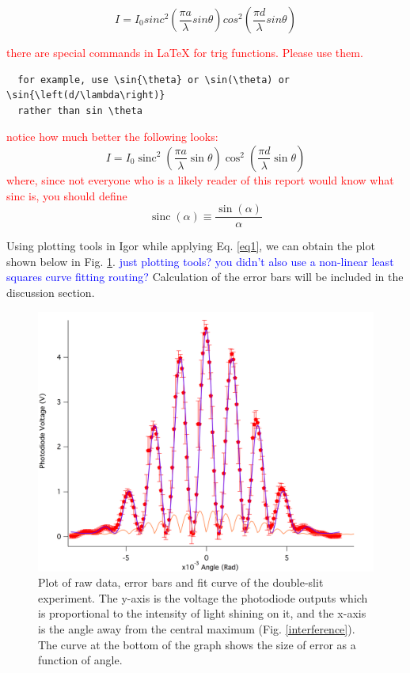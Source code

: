 \documentclass[prb,preprint]{revtex4-1}
\DeclareMathOperator{\sinc}{sinc}
\begin{document}
\begin{equation}
I=I_0 sinc^2( \frac{\pi a}{\lambda} sin \theta)  cos^2(\frac{\pi d}{\lambda} sin \theta)
\label{eq1}
\end{equation}

\textcolor{red}{there are special commands in LaTeX for trig functions. Please use them.}
\begin{verbatim}
  for example, use \sin{\theta} or \sin(\theta) or \sin{\left(d/\lambda\right)} 
  rather than sin \theta
\end{verbatim}
\textcolor{red}{notice how much better the following looks:}
\begin{equation*}
I=I_0 \sinc^2{\left(\frac{\pi a}{\lambda}\sin{\theta}\right)}  \cos^2{\left(\frac{\pi d}{\lambda} \sin \theta\right)}
\end{equation*}
\textcolor{red}{where, since not everyone who is a likely reader of this report would know what sinc is, you should define }
\begin{equation*}
\sinc(\alpha) \equiv \frac{\sin(\alpha)}{\alpha}
\end{equation*}

Using plotting tools in Igor while applying Eq. \ref{eq1}, we can obtain the plot shown below in Fig. \ref{double}. \textcolor{blue}{just plotting tools? you didn't also use a non-linear least squares curve fitting routing?} Calculation of the error bars will be included in the discussion section.

\begin{figure}[h]
\centering
\includegraphics[width=7in]{double.png}
\caption{Plot of raw data, error bars and fit curve of the double-slit experiment. The y-axis is the voltage the photodiode outputs which is proportional to the intensity of light shining on it, and the x-axis is the angle away from the central maximum (Fig. \ref{interference}). The curve at the bottom of the graph shows the size of error as a function of angle.}
\label{double}
\end{figure}
\end{document}

